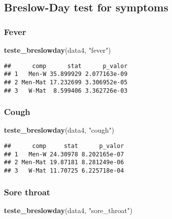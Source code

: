 \documentclass[
]{article}
\newenvironment{Shaded}{\begin{snugshade}}{\end{snugshade}}
\newcommand{\KeywordTok}[1]{\textcolor[rgb]{0.13,0.29,0.53}{\textbf{#1}}}
\newcommand{\NormalTok}[1]{#1}
\newcommand{\StringTok}[1]{\textcolor[rgb]{0.31,0.60,0.02}{#1}}
\begin{document}
\hypertarget{breslow-day-test-for-symptoms}{%
\subsection{Breslow-Day test for
symptoms}\label{breslow-day-test-for-symptoms}}

\hypertarget{fever-3}{%
\subsubsection{Fever}\label{fever-3}}

\begin{Shaded}
\begin{Highlighting}[]
\KeywordTok{teste_breslowday}\NormalTok{(data4, }\StringTok{"fever"}\NormalTok{)}
\end{Highlighting}
\end{Shaded}

\begin{verbatim}
##      comp      stat      p_valor
## 1   Men-W 35.899929 2.077163e-09
## 2 Men-Mat 17.232699 3.306952e-05
## 3   W-Mat  8.599406 3.362726e-03
\end{verbatim}

\hypertarget{cough-3}{%
\subsubsection{Cough}\label{cough-3}}

\begin{Shaded}
\begin{Highlighting}[]
\KeywordTok{teste_breslowday}\NormalTok{(data4, }\StringTok{"cough"}\NormalTok{)}
\end{Highlighting}
\end{Shaded}

\begin{verbatim}
##      comp     stat      p_valor
## 1   Men-W 24.30978 8.202165e-07
## 2 Men-Mat 19.87181 8.281249e-06
## 3   W-Mat 11.70725 6.225718e-04
\end{verbatim}

\hypertarget{sore-throat-3}{%
\subsubsection{Sore throat}\label{sore-throat-3}}

\begin{Shaded}
\begin{Highlighting}[]
\KeywordTok{teste_breslowday}\NormalTok{(data4, }\StringTok{"sore_throat"}\NormalTok{)}
\end{Highlighting}
\end{Shaded}
\end{document}
